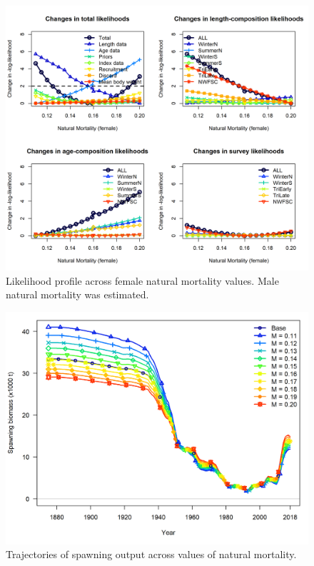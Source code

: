 \documentclass[12pt,]{article}
\begin{document}
\FloatBarrier

\begin{figure}
\centering
\includegraphics{Figures/piner_panel_m.png}
\caption{Likelihood profile across female natural mortality values. Male
natural mortality was estimated. \label{fig:m_like}}
\end{figure}

\FloatBarrier

\begin{figure}
\centering
\includegraphics{Figures/m_trajectories_ssb.png}
\caption{Trajectories of spawning output across values of natural
mortality. \label{fig:m_ssb_trajectory}}
\end{figure}
\end{document}
